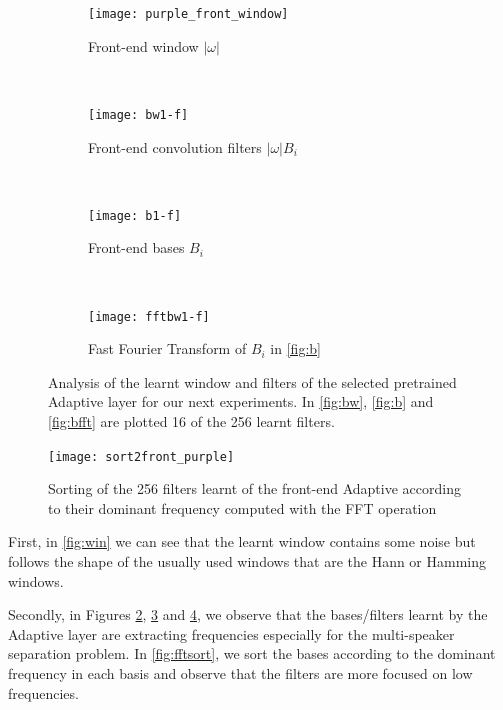 \documentclass[master, tikz, final,11pt, dvipdfmx]{iscs-thesis}
\begin{document}
\begin{figure}[h!]
\centering
\begin{subfigure}[b]{0.45\textwidth}
\texttt{[image: purple\_front\_window]}
\caption{Front-end window $|\omega|$}
\label{fig:win} 
\end{subfigure}
~
\begin{subfigure}[b]{0.45\textwidth}
\texttt{[image: bw1-f]}
\captionsetup{justification=centering}
\caption{Front-end convolution filters $|\omega| B_i$}
\label{fig:bw} 
\end{subfigure}
\\
\begin{subfigure}[b]{0.45\textwidth}
\texttt{[image: b1-f]}
\captionsetup{justification=centering}
\caption{Front-end bases $B_i$}
\label{fig:b} 
\end{subfigure}
~
\begin{subfigure}[b]{0.45\textwidth}
\texttt{[image: fftbw1-f]}
\captionsetup{justification=centering}
\caption{Fast Fourier Transform of $B_i$ in \autoref{fig:b}}
\label{fig:bfft} 
\end{subfigure}

\captionsetup{justification=centering}
\caption[Adaptive layer pretraining results]{Analysis of the learnt window and filters of the selected pretrained Adaptive layer for our next experiments. In \autoref{fig:bw}, \autoref{fig:b} and \autoref{fig:bfft} are plotted 16 of the 256 learnt filters.}
\label{fig:pretrainingadapt} 

\end{figure}

\begin{figure}[h!]
\centering
\texttt{[image: sort2front\_purple]}
\caption{Sorting of the 256 filters learnt of the front-end Adaptive according to their dominant frequency computed with the FFT operation}
\label{fig:fftsort} 
\end{figure}

First, in \autoref{fig:win} we can see that the learnt window contains some noise but follows the shape of the usually used windows that are the Hann or Hamming windows.

Secondly, in Figures \ref{fig:bw}, \ref{fig:b} and \ref{fig:bfft}, we observe that the bases/filters learnt by the Adaptive layer are extracting frequencies especially for the multi-speaker separation problem. In \autoref{fig:fftsort}, we sort the bases according to the dominant frequency in each basis and observe that the filters are more focused on low frequencies.
\end{document}
